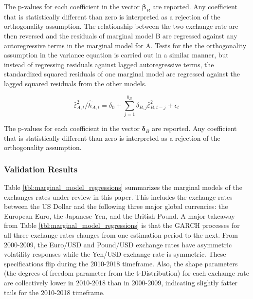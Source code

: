 \documentclass[12pt]{article}
\begin{document}
The p-values for each coefficient in the vector $\boldsymbol{\beta}_{B}$ are reported. Any coefficient that is statistically different than zero is interpreted as a rejection of the orthogonality assumption. The relationship between the two exchange rate are then reversed and the residuals of marginal model B are regressed against any autoregressive terms in the marginal model for A. Tests for the the orthogonality assumption in the variance equation is carried out in a similar manner, but instead of regressing residuals against lagged autoregressive terms, the standardized squared residuals of one marginal model are regressed against the lagged squared residuals from the other models.

\begin{equation}  \label{eq:var_orthogonality_assumption}
	\hat{\varepsilon}_{A,t}^{2} / \hat{h}_{A,t} = \delta_{0} + \sum_{j=1}^{b_{B}}\delta_{B,j} \hat{\varepsilon}^{2}_{B, t-j} + \epsilon_{t}
\end{equation}

The p-values for each coefficient in the vector $\boldsymbol{\delta}_{B}$ are reported. Any coefficient that is statistically different than zero is interpreted as a rejection of the orthogonality assumption.

\subsubsection{Validation Results}

Table \ref{tbl:marginal_model_regressions} summarizes the marginal models of the exchanges rates under review in this paper. This includes the exchange rates between the US Dollar and the following three major global currencies: the European Euro, the Japanese Yen, and the British Pound. A major takeaway from Table \ref{tbl:marginal_model_regressions} is that the GARCH processes for all three exchange rates changes from one estimation period to the next. From 2000-2009, the Euro/USD and Pound/USD exchange rates have asymmetric volatility responses while the Yen/USD exchange rate is symmetric. These specifications flip during the 2010-2018 timeframe. Also, the shape parameters (the degrees of freedom parameter from the t-Distribution) for each exchange rate are collectively lower in 2010-2018 than in 2000-2009, indicating slightly fatter tails for the 2010-2018 timeframe.
\end{document}
